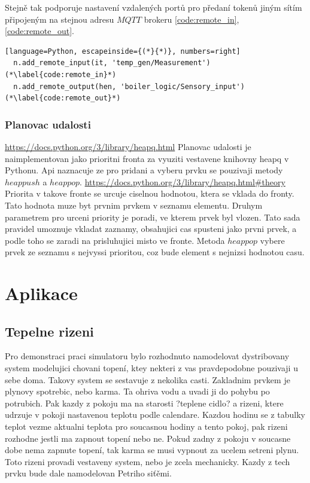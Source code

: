 Stejně tak podporuje nastavení vzdalených portů pro předaní tokenů jiným sítím připojeným na stejnou adresu $MQTT$ brokeru \ref{code:remote_in}, \ref{code:remote_out}.
\begin{lstlisting}[language=Python, escapeinside={(*}{*)}, numbers=right]
  n.add_remote_input(it, 'temp_gen/Measurement') (*\label{code:remote_in}*)
  n.add_remote_output(hen, 'boiler_logic/Sensory_input') (*\label{code:remote_out}*)
\end{lstlisting}


\subsection{Planovac udalosti}
\url{https://docs.python.org/3/library/heapq.html}
Planovac udalosti je naimplementovan jako prioritni fronta za vyuziti vestavene knihovny heapq v Pythonu. Api naznacuje ze pro pridani a vyberu prvku se pouzivaji metody $heappush$ a $heappop$. \url{https://docs.python.org/3/library/heapq.html#theory} Priorita v takove fronte se urcuje ciselnou hodnotou, ktera se vklada do fronty. Tato hodnota muze byt prvnim prvkem v seznamu elementu. Druhym parametrem pro urceni priority je poradi, ve kterem prvek byl vlozen. Tato sada pravidel umoznuje vkladat zaznamy, obsahujici cas spusteni jako prvni prvek, a podle toho se zaradi na prisluhujici misto ve fronte. Metoda $heappop$ vybere prvek ze seznamu s nejvyssi prioritou, coz bude element s nejnizsi hodnotou casu.
\chapter{Aplikace}
\section{Tepelne rizeni}
Pro demonstraci praci simulatoru bylo rozhodnuto namodelovat dystribovany system modelujici chovani topení, ktey nekteri z vas pravdepodobne pouzivaji u sebe doma. Takovy system se sestavuje z nekolika casti. Zakladnim prvkem je plynovy spotrebic, nebo karma. Ta ohriva vodu a uvadi ji do pohybu po potrubich. Pak kazdy z pokoju ma na starosti ?teplene cidlo? a rizeni, ktere udrzuje v pokoji nastavenou teplotu podle calendare. Kazdou hodinu se z tabulky teplot vezme aktualni teplota pro soucasnou hodiny a tento pokoj, pak rizeni rozhodne jestli ma zapnout topení nebo ne. Pokud zadny z pokoju v soucasne dobe nema zapnute topení, tak karma se musi vypnout za ucelem setreni plynu. Toto rizeni provadi vestaveny system, nebo je zcela mechanicky. Kazdy z tech prvku bude dale namodelovan Petriho siťěmi.


